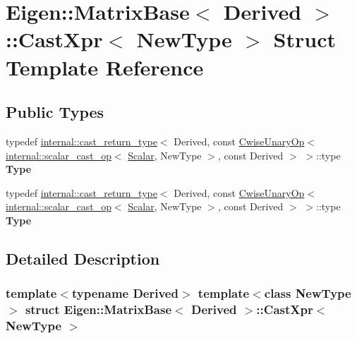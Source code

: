 \hypertarget{struct_eigen_1_1_matrix_base_1_1_cast_xpr}{}\section{Eigen\+:\+:Matrix\+Base$<$ Derived $>$\+:\+:Cast\+Xpr$<$ New\+Type $>$ Struct Template Reference}
\label{struct_eigen_1_1_matrix_base_1_1_cast_xpr}
\subsection*{Public Types}
\begin{DoxyCompactItemize}
\item 
\mbox{\label{struct_eigen_1_1_matrix_base_1_1_cast_xpr_ac97d00889be890a13ca4059798508bd8}} 
typedef \hyperlink{struct_eigen_1_1internal_1_1cast__return__type}{internal\+::cast\+\_\+return\+\_\+type}$<$ Derived, const \hyperlink{group___core___module_class_eigen_1_1_cwise_unary_op}{Cwise\+Unary\+Op}$<$ \hyperlink{struct_eigen_1_1internal_1_1scalar__cast__op}{internal\+::scalar\+\_\+cast\+\_\+op}$<$ \hyperlink{group___core___module_a5feed465b3a8e60c47e73ecce83e39a2}{Scalar}, New\+Type $>$, const Derived $>$ $>$\+::type {\bfseries Type}
\item 
\mbox{\label{struct_eigen_1_1_matrix_base_1_1_cast_xpr_ac97d00889be890a13ca4059798508bd8}} 
typedef \hyperlink{struct_eigen_1_1internal_1_1cast__return__type}{internal\+::cast\+\_\+return\+\_\+type}$<$ Derived, const \hyperlink{group___core___module_class_eigen_1_1_cwise_unary_op}{Cwise\+Unary\+Op}$<$ \hyperlink{struct_eigen_1_1internal_1_1scalar__cast__op}{internal\+::scalar\+\_\+cast\+\_\+op}$<$ \hyperlink{group___core___module_a5feed465b3a8e60c47e73ecce83e39a2}{Scalar}, New\+Type $>$, const Derived $>$ $>$\+::type {\bfseries Type}
\end{DoxyCompactItemize}


\subsection{Detailed Description}
\subsubsection*{template$<$typename Derived$>$\newline
template$<$class New\+Type$>$\newline
struct Eigen\+::\+Matrix\+Base$<$ Derived $>$\+::\+Cast\+Xpr$<$ New\+Type $>$}



